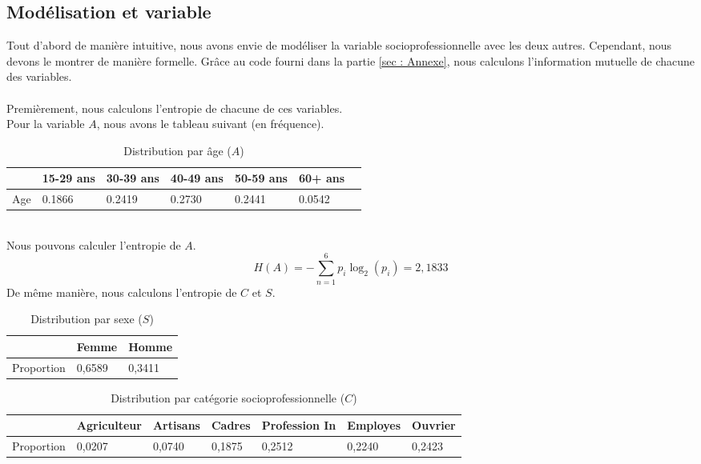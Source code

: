 \documentclass{article}
\begin{document}
\subsection{Modélisation et variable}
\label{1.1}
Tout d'abord de manière intuitive, nous avons envie de modéliser la variable
socioprofessionnelle avec les deux autres. Cependant, nous devons
le montrer de manière formelle. Grâce au code fourni dans la partie \ref{sec : Annexe},
nous calculons l'information mutuelle de chacune des variables.\\\\
Premièrement, nous calculons l'entropie de chacune de ces variables.\\
Pour la variable $A$, nous avons le tableau suivant (en fréquence). 
\begin{table}[ht]
  \centering
  \begin{tabular}{|l|l|l|l|l|l|l|}
    \hline
    & 15-29 ans  & 30-39 ans  & 40-49 ans  & 50-59 ans  & 60+ ans \\ \hline
    Age & 0.1866 & 0.2419 & 0.2730 & 0.2441 & 0.0542 \\ \hline
  \end{tabular}
  \caption{Distribution par âge ($A$)}
\end{table}
\\Nous pouvons calculer l'entropie de $A$.\\
\[
H(A) = -\sum_{n = 1}^{6}p_i\log_2(p_i)=2,1833
\]
De même manière, nous calculons l'entropie de $C$ et $S$.\\
\begin{table}[H]
  \centering
  \begin{tabular}{|l|l|l|}
  \hline
             & Femme  & Homme  \\ \hline
  Proportion & 0,6589 & 0,3411 \\ \hline
  \end{tabular}
  \caption{Distribution par sexe ($S$)}
\end{table}

\begin{table}[H]
  \centering
  \begin{tabular}{|l|l|l|l|l|l|l|}
  \hline
             & Agriculteur & Artisans & Cadres & Profession In & Employes & Ouvrier \\ \hline
  Proportion & 0,0207      & 0,0740   & 0,1875 & 0,2512        & 0,2240   & 0,2423  \\ \hline
  \end{tabular}
  \caption{Distribution par catégorie socioprofessionnelle ($C$)}
  \end{table}
\end{document}
